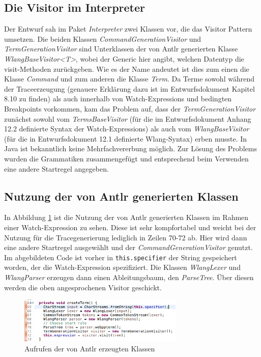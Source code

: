 \documentclass[parskip=full]{scrartcl}
\begin{document}
\subsection{Die Visitor im Interpreter} Der Entwurf sah im Paket \textit{Interpreter} zwei Klassen vor, die das Visitor Pattern umsetzen. Die beiden Klassen \textit{CommandGenerationVisitor} und \textit{TermGenerationVisitor} sind Unterklassen der von Antlr generierten Klasse \textit{WlangBaseVisitor<T>}, wobei der Generic hier angibt, welchen Datentyp die visit-Methoden zurückgeben. Wie es der Name andeutet ist dies zum einen die Klasse \textit{Command} und zum anderen die Klasse \textit{Term}. 
Da Terme sowohl während der Traceerzeugung (genauere Erklärung dazu ist im Entwurfsdokument Kapitel 8.10 zu finden) als auch innerhalb von Watch-Expressions und bedingten Breakpoints vorkommen, kam das Problem auf, dass der \textit{TermGenerationVisitor} zunächst sowohl vom \textit{TermsBaseVisitor} (für die im Entwurfsdokument Anhang 12.2 definierte Syntax der Watch-Expressions) als auch vom \textit{WlangBaseVisitor} (für die in Entwurfsdokument 12.1 definierte Wlang-Syntax) erben musste. In Java ist bekanntlich keine Mehrfachvererbung möglich. Zur Lösung des Problems wurden die Grammatiken zusammengefügt und entsprechend beim Verwenden eine andere Startregel angegeben. 
\subsection{Nutzung der von Antlr generierten Klassen}
In Abbildung \ref{createTerm} ist die Nutzung der von Antlr generierten Klassen im Rahmen einer Watch-Expression zu sehen. Diese ist sehr kompfortabel und weicht bei der Nutzung für die Tracegenerierung lediglich in Zeilen 70-72 ab. Hier wird dann eine andere Startregel ausgewählt und der \textit{CommandGenerationVisitor} genutzt. Im abgebildeten Code ist vorher in \texttt{this.specifier} der String gespeichert worden, der die Watch-Expression spezifiziert. Die Klassen \textit{WlangLexer} und \textit{WlangParser} erzeugen dann einen Ableitungsbaum, den \textit{ParseTree}. Über diesen werden die oben angesprochenen Visitor geschickt.
\begin{figure}[!h]
\includegraphics[width=0.7\textwidth]{document_data/createTerm.png}
\caption{Aufrufen der von Antlr erzeugten Klassen}
\label{createTerm}
\end{figure}
\end{document}
